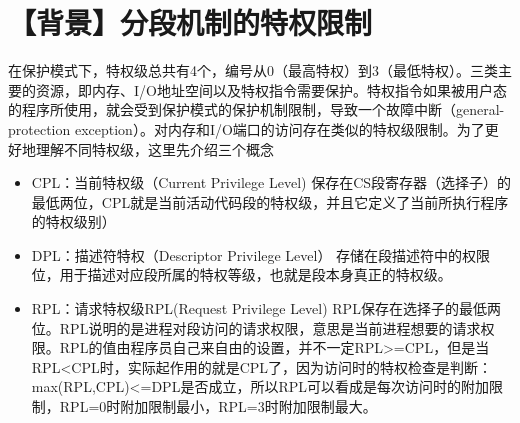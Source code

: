 \section{【背景】分段机制的特权限制}\label{ux80ccux666fux5206ux6bb5ux673aux5236ux7684ux7279ux6743ux9650ux5236}

在保护模式下，特权级总共有4个，编号从0（最高特权）到3（最低特权）。三类主要的资源，即内存、I/O地址空间以及特权指令需要保护。特权指令如果被用户态的程序所使用，就会受到保护模式的保护机制限制，导致一个故障中断（general-protection
exception）。对内存和I/O端口的访问存在类似的特权级限制。为了更好地理解不同特权级，这里先介绍三个概念

\begin{itemize}
\tightlist
\item
  CPL：当前特权级（Current Privilege Level)
  保存在CS段寄存器（选择子）的最低两位，CPL就是当前活动代码段的特权级，并且它定义了当前所执行程序的特权级别）
\item
  DPL：描述符特权（Descriptor Privilege Level）
  存储在段描述符中的权限位，用于描述对应段所属的特权等级，也就是段本身真正的特权级。
\item
  RPL：请求特权级RPL(Request Privilege Level)
  RPL保存在选择子的最低两位。RPL说明的是进程对段访问的请求权限，意思是当前进程想要的请求权限。RPL的值由程序员自己来自由的设置，并不一定RPL\textgreater{}=CPL，但是当RPL\textless{}CPL时，实际起作用的就是CPL了，因为访问时的特权检查是判断：max(RPL,CPL)\textless{}=DPL是否成立，所以RPL可以看成是每次访问时的附加限制，RPL=0时附加限制最小，RPL=3时附加限制最大。
\end{itemize}
